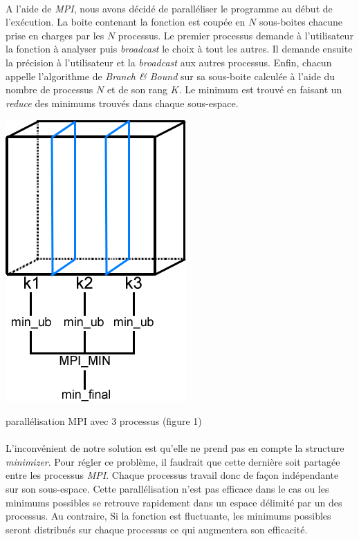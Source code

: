 \documentclass[a4paper]{article}
\begin{document}
    \paragraph{}
    A l'aide de \emph{MPI}, nous avons décidé de paralléliser le programme au début de l’exécution. La boite contenant la fonction est coupée en $N$ sous-boites chacune prise en charges par les $N$ processus.
    Le premier processus demande à l'utilisateur la fonction à analyser puis \emph{broadcast} le choix à tout les autres. Il demande ensuite la précision à l'utilisateur et la \emph{broadcast} aux autres processus.
    Enfin, chacun appelle l'algorithme de \emph{Branch \& Bound} sur sa sous-boite calculée à l'aide du nombre de processus $N$ et de son rang $K$. Le minimum est trouvé en faisant un \emph{reduce} des minimums trouvés dans chaque sous-espace.
    \begin{center}
    \includegraphics[scale=0.7]{min_mpi.png}
    {\footnotesize

    parallélisation MPI avec 3 processus (figure 1)\par}
    \end{center}
    \paragraph{}
    L’inconvénient de notre solution est qu'elle ne prend pas en compte la structure \emph{minimizer}. Pour régler ce problème, il faudrait que cette dernière soit partagée entre les processus \emph{MPI}. Chaque processus travail donc de façon indépendante sur son sous-espace. Cette parallélisation n'est pas efficace dans le cas ou les minimums possibles se retrouve rapidement dans un espace délimité par un des processus. Au contraire, Si la fonction est fluctuante, les minimums possibles seront distribués sur chaque processus ce qui augmentera son efficacité.
\end{document}
